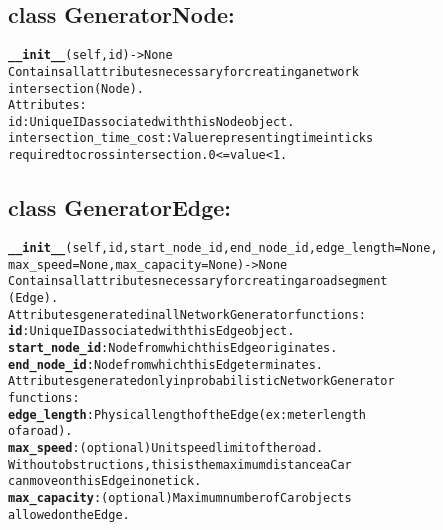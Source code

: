 \subsection{class GeneratorNode:}

\begin{alltt}
\textbf{__init__}(self, id) -> None
Contains all attributes necessary for creating a network 
intersection (Node).
Attributes:
    id:  Unique ID associated with this Node object.
    intersection_time_cost:  Value representing time in ticks 
    required to cross intersection.  0 <= value < 1.
\end{alltt}


\subsection{class GeneratorEdge:}

\begin{alltt}
\textbf{__init__}(self, id, start_node_id, end_node_id, edge_length=None,
max_speed=None, max_capacity=None) -> None
Contains all attributes necessary for creating a road segment 
(Edge).
Attributes generated in all NetworkGenerator functions:
    \textbf{id}:  Unique ID associated with this Edge object.
    \textbf{start_node_id}:  Node from which this Edge originates.
    \textbf{end_node_id}:  Node from which this Edge terminates.
Attributes generated only in probabilistic NetworkGenerator 
functions:
    \textbf{edge_length}:  Physical length of the Edge (ex: meter length 
    of a road).
    \textbf{max_speed}:  (optional) Unit speed limit of the road.  
    Without obstructions, this is the maximum distance a Car 
    can move on this Edge in one tick.
    \textbf{max_capacity}:  (optional) Maximum number of Car objects
    allowed on the Edge.
\end{alltt}